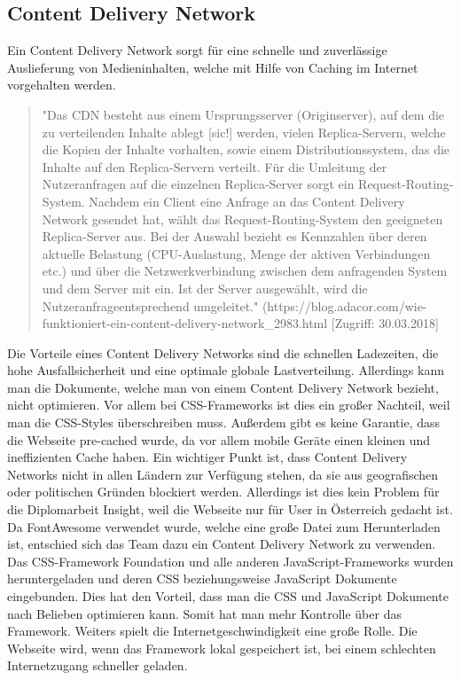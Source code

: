 \subsection{Content Delivery Network}
Ein Content Delivery Network sorgt für eine schnelle und zuverlässige Auslieferung von Medieninhalten, welche mit Hilfe von Caching im Internet vorgehalten werden. \cite{cdn}

\begin{quote}
"Das CDN besteht aus einem Ursprungsserver (Originserver), auf dem die zu verteilenden Inhalte ablegt [sic!] werden, vielen Replica-Servern, welche die Kopien der Inhalte vorhalten, sowie einem Distributionssystem, das die Inhalte auf den Replica-Servern verteilt. Für die Umleitung der Nutzeranfragen auf die einzelnen Replica-Server sorgt ein Request-Routing-System. Nachdem ein Client eine Anfrage an das Content Delivery Network gesendet hat, wählt das Request-Routing-System den geeigneten Replica-Server aus. Bei der Auswahl bezieht es Kennzahlen über deren aktuelle Belastung (CPU-Auslastung, Menge der aktiven Verbindungen etc.) und über die Netzwerkverbindung zwischen dem anfragenden System und dem Server mit ein. Ist der Server ausgewählt, wird die Nutzeranfrageentsprechend umgeleitet." (https://blog.adacor.com/wie-funktioniert-ein-content-delivery-network\_2983.html [Zugriff: 30.03.2018]
\end{quote}
Die Vorteile eines Content Delivery Networks sind die schnellen Ladezeiten, die hohe Ausfallsicherheit und eine optimale globale Lastverteilung. Allerdings kann man die Dokumente, welche man von einem Content Delivery Network bezieht, nicht optimieren. Vor allem bei CSS-Frameworks ist dies ein großer Nachteil, weil man die CSS-Styles überschreiben muss. Außerdem gibt es keine Garantie, dass die Webseite pre-cached wurde, da vor allem mobile Geräte einen kleinen und ineffizienten Cache haben. Ein wichtiger Punkt ist, dass Content Delivery Networks nicht in allen Ländern zur Verfügung stehen, da sie aus geografischen oder politischen Gründen blockiert werden. Allerdings ist dies kein Problem für die Diplomarbeit Insight, weil die Webseite nur für User in Österreich gedacht ist. \cite{cdnnachteile}
\leavevmode \\
Da FontAwesome verwendet wurde, welche eine große Datei zum Herunterladen ist, entschied sich das Team dazu ein Content Delivery Network zu verwenden. Das CSS-Framework Foundation und alle anderen JavaScript-Frameworks wurden heruntergeladen und deren CSS beziehungsweise JavaScript Dokumente eingebunden. Dies hat den Vorteil, dass man die CSS und JavaScript Dokumente nach Belieben optimieren kann. Somit hat man mehr Kontrolle über das Framework. Weiters spielt die Internetgeschwindigkeit eine große Rolle. Die Webseite wird, wenn das Framework lokal gespeichert ist, bei einem schlechten Internetzugang schneller geladen.
